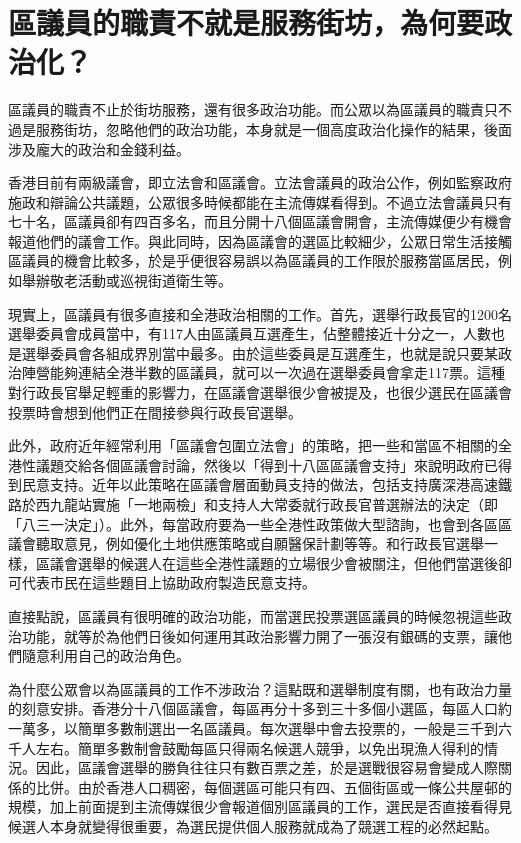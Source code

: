 \section{區議員的職責不就是服務街坊，為何要政治化？}

區議員的職責不止於街坊服務，還有很多政治功能。而公眾以為區議員的職責只不過是服務街坊，忽略他們的政治功能，本身就是一個高度政治化操作的結果，後面涉及龐大的政治和金錢利益。

香港目前有兩級議會，即立法會和區議會。立法會議員的政治公作，例如監察政府施政和辯論公共議題，公眾很多時候都能在主流傳媒看得到。不過立法會議員只有七十名，區議員卻有四百多名，而且分開十八個區議會開會，主流傳媒便少有機會報道他們的議會工作。與此同時，因為區議會的選區比較細少，公眾日常生活接觸區議員的機會比較多，於是乎便很容易誤以為區議員的工作限於服務當區居民，例如舉辦敬老活動或巡視街道衛生等。

現實上，區議員有很多直接和全港政治相關的工作。首先，選舉行政長官的1200名選舉委員會成員當中，有117人由區議員互選產生，佔整體接近十分之一，人數也是選舉委員會各組成界別當中最多。由於這些委員是互選產生，也就是說只要某政治陣營能夠連結全港半數的區議員，就可以一次過在選舉委員會拿走117票。這種對行政長官舉足輕重的影響力，在區議會選舉很少會被提及，也很少選民在區議會投票時會想到他們正在間接參與行政長官選舉。

此外，政府近年經常利用「區議會包圍立法會」的策略，把一些和當區不相關的全港性議題交給各個區議會討論，然後以「得到十八區區議會支持」來說明政府已得到民意支持。近年以此策略在區議會層面動員支持的做法，包括支持廣深港高速鐵路於西九龍站實施「一地兩檢」和支持人大常委就行政長官普選辦法的決定（即「八三一決定」）。此外，每當政府要為一些全港性政策做大型諮詢，也會到各區區議會聽取意見，例如優化土地供應策略或自願醫保計劃等等。和行政長官選舉一樣，區議會選舉的候選人在這些全港性議題的立場很少會被關注，但他們當選後卻可代表市民在這些題目上協助政府製造民意支持。

直接點說，區議員有很明確的政治功能，而當選民投票選區議員的時候忽視這些政治功能，就等於為他們日後如何運用其政治影響力開了一張沒有銀碼的支票，讓他們隨意利用自己的政治角色。

為什麼公眾會以為區議員的工作不涉政治？這點既和選舉制度有關，也有政治力量的刻意安排。香港分十八個區議會，每區再分十多到三十多個小選區，每區人口約一萬多，以簡單多數制選出一名區議員。每次選舉中會去投票的，一般是三千到六千人左右。簡單多數制會鼓勵每區只得兩名候選人競爭，以免出現漁人得利的情況。因此，區議會選舉的勝負往往只有數百票之差，於是選戰很容易會變成人際關係的比併。由於香港人口稠密，每個選區可能只有四、五個街區或一條公共屋邨的規模，加上前面提到主流傳媒很少會報道個別區議員的工作，選民是否直接看得見候選人本身就變得很重要，為選民提供個人服務就成為了競選工程的必然起點。

